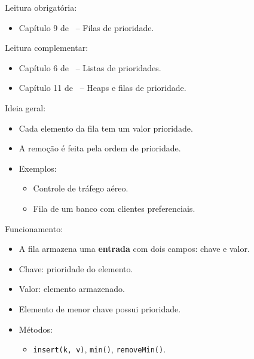 \newcommand{\templatesdir}{../../../templates}
\newcommand{\template}{template-roteiro-est}


\newcommand{\content}{Filas de prioridade}
\newcommand{\class}{Algoritmos e Estruturas de Dados}
\newcommand{\shortcourse}{45EST}



\makeheader

{
Leitura obrigatória:
\begin{itemize}
	\item Capítulo 9 de~\cite{GoodrichEtAl2014} -- Filas de prioridade.
\end{itemize}

Leitura complementar:
\begin{itemize}
	\item Capítulo 6 de~\cite{SzwarcfiterAndMarkenzon1994} -- Listas de prioridades.
	\item Capítulo 11 de~\cite{Preiss2001} -- Heaps e filas de prioridade.
\end{itemize}
}

\medskip


Ideia geral:
\begin{itemize}
	\item Cada elemento da fila tem um valor prioridade.
	\item A remoção é feita pela ordem de prioridade.
	\item Exemplos:
	\begin{itemize}
		\item Controle de tráfego aéreo.
		\item Fila de um banco com clientes preferenciais.
	\end{itemize}
\end{itemize}

\medskip

Funcionamento:
\begin{itemize}
	\item A fila armazena uma \textbf{entrada} com dois campos: chave e valor.
	\item Chave: prioridade do elemento.
	\item Valor: elemento armazenado.
	\item Elemento de menor chave possui prioridade.
	\item Métodos:
	\begin{itemize}
		\item \texttt{insert(k,\,v)}, \texttt{min()}, \texttt{removeMin()}.
	\end{itemize}
\end{itemize}

